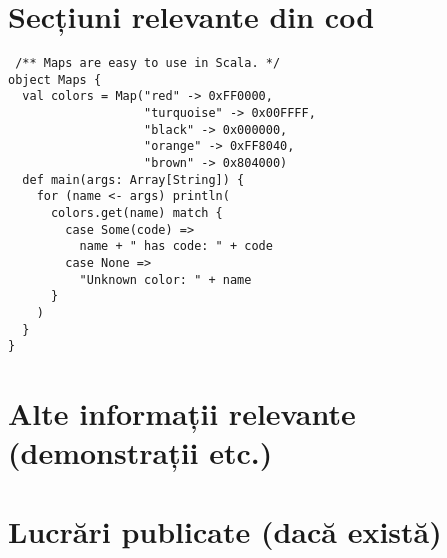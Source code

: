 \appendix
\chapter{Secțiuni relevante din cod}
\pagestyle{fancy}

\begin{verbatim}
 /** Maps are easy to use in Scala. */
object Maps {
  val colors = Map("red" -> 0xFF0000,
                   "turquoise" -> 0x00FFFF,
                   "black" -> 0x000000,
                   "orange" -> 0xFF8040,
                   "brown" -> 0x804000)
  def main(args: Array[String]) {
    for (name <- args) println(
      colors.get(name) match {
        case Some(code) =>
          name + " has code: " + code
        case None =>
          "Unknown color: " + name
      }
    )
  }
}
\end{verbatim}

\chapter{Alte informații relevante (demonstrații etc.)}


\chapter{Lucrări publicate (dacă există)}
